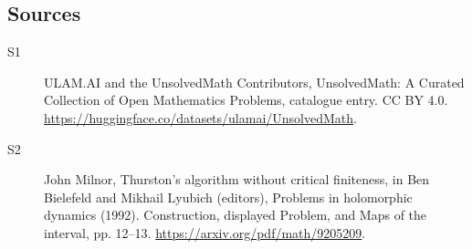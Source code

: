 \documentclass[11pt]{article}
\begin{document}
\subsection{Sources}
\begin{description}
\item[\hypertarget{source:statement:1}{S1}] ULAM.AI and the UnsolvedMath Contributors, UnsolvedMath: A Curated Collection of Open Mathematics Problems, catalogue entry. CC BY 4.0. \url{https://huggingface.co/datasets/ulamai/UnsolvedMath}.
\item[\hypertarget{source:statement:2}{S2}] John Milnor, Thurston’s algorithm without critical finiteness, in Ben Bielefeld and Mikhail Lyubich (editors), Problems in holomorphic dynamics (1992). Construction, displayed Problem, and Maps of the interval, pp. 12–13. \url{https://arxiv.org/pdf/math/9205209}.
\end{description}
\label{end:statement}
\end{document}
